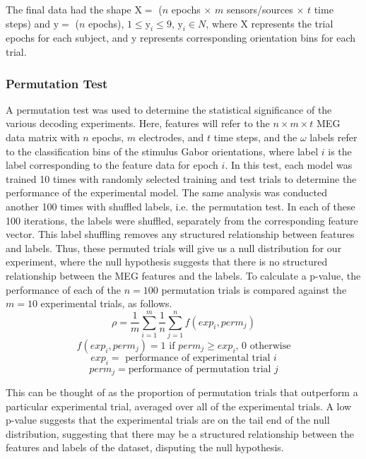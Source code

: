 \documentclass[../main.tex]{subfiles}
\begin{document}
The final data had the shape $\mathrm{X} = $ ($n$ epochs $\times$ $m$ sensors/sources $\times$ $t$ time steps) and $\mathrm{y} = $ ($n$ epochs), $1 \leq \mathrm{y}_i \leq 9$, $\mathrm{y}_i \in N$, where X represents the trial epochs for each subject, and y represents corresponding orientation bins for each trial.

\subsubsection*{Permutation Test}
A permutation test was used to determine the statistical significance of the various decoding experiments. Here, features will refer to the $n \times m \times t$ MEG data matrix with $n$ epochs, $m$ electrodes, and $t$ time steps, and the $\omega$ labels refer to the classification bins of the stimulus Gabor orientations, where label $i$ is the label corresponding to the feature data for epoch $i$. In this test, each model was trained 10 times with randomly selected training and test trials to determine the performance of the experimental model. The same analysis was conducted another 100 times with shuffled labels, i.e. the permutation test. In each of these 100 iterations, the labels were shuffled, separately from the corresponding feature vector. This label shuffling removes any structured relationship between features and labels. Thus, these permuted trials will give us a null distribution for our experiment, where the null hypothesis suggests that there is no structured relationship between the MEG features and the labels. To calculate a p-value, the performance of each of the $n = 100$ permutation trials is compared against the $m = 10$ experimental trials, as follows. 
$$\rho = \frac{1}{m}\sum_{i=1}^{m}{\frac{1}{n}\sum_{j=1}^{n}{f(exp_i, perm_j)}}$$
$$f(exp_i, perm_j) = 1 \mbox{ if } perm_j \geq exp_i \mbox{, } 0 \mbox{ otherwise}$$
$$ exp_i = \mbox{ performance of experimental trial } i$$
$$ perm_j = \mbox{performance of permutation trial } j $$

This can be thought of as the proportion of permutation trials that outperform a particular experimental trial, averaged over all of the experimental trials. A low p-value suggests that the experimental trials are on the tail end of the null distribution, suggesting that there may be a structured relationship between the features and labels of the dataset, disputing the null hypothesis.
\end{document}
